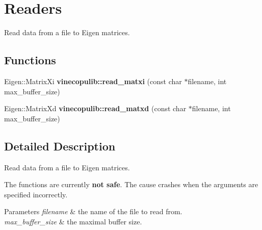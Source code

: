 \hypertarget{group__readers}{}\section{Readers}
\label{group__readers}


Read data from a file to Eigen matrices.  


\subsection*{Functions}
\begin{DoxyCompactItemize}
\item 
Eigen\+::\+Matrix\+Xi {\bfseries vinecopulib\+::read\+\_\+matxi} (const char $\ast$filename, int max\+\_\+buffer\+\_\+size)\hypertarget{group__readers_ga7c8538807c0c4f07ed8dd3e0c8aab5f6}{}\label{group__readers_ga7c8538807c0c4f07ed8dd3e0c8aab5f6}

\item 
Eigen\+::\+Matrix\+Xd {\bfseries vinecopulib\+::read\+\_\+matxd} (const char $\ast$filename, int max\+\_\+buffer\+\_\+size)\hypertarget{group__readers_ga878dd05685496911a31657a23267cd8e}{}\label{group__readers_ga878dd05685496911a31657a23267cd8e}

\end{DoxyCompactItemize}


\subsection{Detailed Description}
Read data from a file to Eigen matrices. 

The functions are currently {\bfseries not safe}. The cause crashes when the arguments are specified incorrectly.


\begin{DoxyParams}{Parameters}
{\em filename} & the name of the file to read from. \\
\hline
{\em max\+\_\+buffer\+\_\+size} & the maximal buffer size. \\
\hline
\end{DoxyParams}
